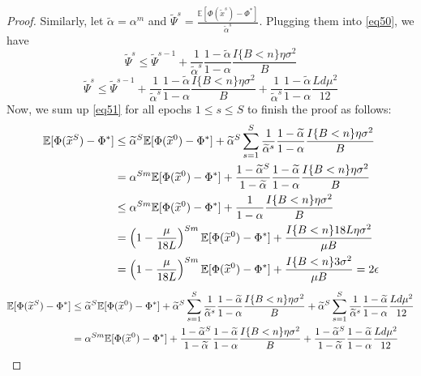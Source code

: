 \documentclass{article}
\newcommand*{\E}{\mathbb{E}}
\theoremstyle{definition}
\theoremstyle{remark}
\begin{document}
\begin{proof}
Similarly, let  $\tilde{\alpha} = \alpha^m$ and $\tilde{\Psi}^s = \frac{\E[\Phi(\tilde{x}^{s})-\Phi^*]}{\tilde{\alpha}^s}$. Plugging them into \eqref{eq50}, we have
\begin{equation}\label{eq51}
\widetilde{\Psi}^s \leq \widetilde{\Psi}^{s-1} + \frac{1}{\tilde{\alpha}^s} \frac{1-\tilde{\alpha}}{1-{\alpha}}\frac{I\{B < n\}\eta \sigma ^2}{B}
\end{equation}
{\color{blue}
\begin{equation}\label{eq51}
\widetilde{\Psi}^s \leq \widetilde{\Psi}^{s-1} + \frac{1}{\tilde{\alpha}^s} \frac{1-\tilde{\alpha}}{1-{\alpha}}\frac{I\{B < n\}\eta \sigma ^2}{B}+ \frac{1}{\tilde{\alpha}^s} \frac{1-\tilde{\alpha}}{1-{\alpha}}\frac{L d \mu^2}{12}
\end{equation}
}
Now, we sum up \eqref{eq51} for all epochs $1 \leq s \leq S$ to finish the proof as follows:
\begin{align}
\E[\Phi(\widetilde{x}^S) - {\Phi}^*] & \leq \widetilde{\alpha}^{S} \E[\Phi(\widetilde{x}^0) - {\Phi}^*] + \widetilde{\alpha}^{S} \sum_{s=1}^S \frac{1}{\widetilde{\alpha}^s}\frac{1-\widetilde{\alpha}}{1-{\alpha}}\frac{I\{B < n\}\eta \sigma ^2}{B}\notag\\
& = {\alpha}^{Sm} \E[\Phi(\widetilde{x}^0) - {\Phi}^*] + \frac{1-\widetilde{\alpha}^S}{1-\widetilde{\alpha}}\frac{1-\widetilde{\alpha}}{1-{\alpha}}\frac{I\{B < n\}\eta \sigma ^2}{B}\notag\\
& \leq {\alpha}^{Sm} \E[\Phi(\widetilde{x}^0) - {\Phi}^*] + \frac{1}{1-{\alpha}}\frac{I\{B < n\}\eta \sigma ^2}{B}\notag\\
& = \left(1-\frac{\mu}{18L}\right)^{Sm} \E[\Phi(\widetilde{x}^0) - {\Phi}^*] + \frac{I\{B < n\}18L\eta \sigma ^2}{\mu B}\label{eq52}\\
& = \left(1-\frac{\mu}{18L}\right)^{Sm} \E[\Phi(\widetilde{x}^0) - {\Phi}^*] + \frac{I\{B < n\}3 \sigma ^2}{\mu B} = 2 \epsilon\label{eq53}
\end{align}
{\color{blue}
\begin{align}
\E[\Phi(\widetilde{x}^S) - {\Phi}^*] & \leq \widetilde{\alpha}^{S} \E[\Phi(\widetilde{x}^0) - {\Phi}^*] + \widetilde{\alpha}^{S} \sum_{s=1}^S \frac{1}{\widetilde{\alpha}^s}\frac{1-\widetilde{\alpha}}{1-{\alpha}}\frac{I\{B < n\}\eta \sigma ^2}{B} + \widetilde{\alpha}^{S} \sum_{s=1}^S \frac{1}{\widetilde{\alpha}^s}\frac{1-\widetilde{\alpha}}{1-{\alpha}}\frac{L d \mu^2}{12}\notag\\
& = {\alpha}^{Sm} \E[\Phi(\widetilde{x}^0) - {\Phi}^*] + \frac{1-\widetilde{\alpha}^S}{1-\widetilde{\alpha}}\frac{1-\widetilde{\alpha}}{1-{\alpha}}\frac{I\{B < n\}\eta \sigma ^2}{B}+ \frac{1-\widetilde{\alpha}^S}{1-\widetilde{\alpha}}\frac{1-\widetilde{\alpha}}{1-{\alpha}}\frac{L d \mu^2}{12}\notag\\

\end{align}}
\end{proof}
\end{document}
